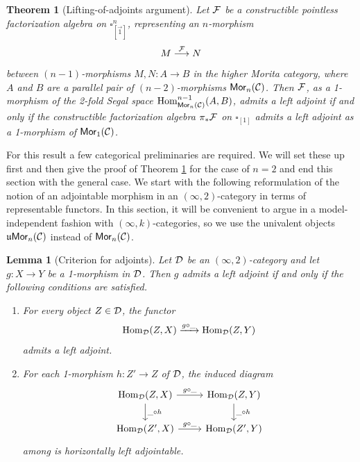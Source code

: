 \documentclass[10pt, reqno, twoside
, final
]{amsart}
\numberwithin{equation}{subsection}%
\theoremstyle{definition}
\theoremstyle{definition}
\theoremstyle{definition}
\theoremstyle{definition}
\theoremstyle{definition}
\theoremstyle{definition}
\theoremstyle{definition}
\theoremstyle{definition}
\theoremstyle{definition}
\theoremstyle{plain}
\newtheorem{thm}[defn]{Theorem}
\theoremstyle{definition}
\theoremstyle{plain}
\theoremstyle{definition}
\theoremstyle{plain}
\theoremstyle{definition}
\theoremstyle{definition}
\theoremstyle{plain}
\newtheorem{lem}[defn]{Lemma}
\theoremstyle{plain}
\theoremstyle{definition}
\theoremstyle{plain}
\theoremstyle{plain}
\theoremstyle{plain}
\begin{document}
\begin{thm}[Lifting-of-adjoints argument]\label{thm:main-lifting-lemma}
Let $\mathcal{F}$ be a constructible pointless factorization algebra on $\square^n_{[\vec{1}]}$, representing an $n$-morphism
\[  M\overset{\mathcal{F}}{\longrightarrow}N  \]
between $(n-1)$-morphisms $M,N:A\rightarrow B$ in the higher Morita category, where $A$ and $B$ are a parallel pair of $(n-2)$-morphisms $\mathsf{Mor}_n(\mathcal{C})$. Then $\mathcal{F}$, as a 1-morphism of the 2-fold Segal space $\mathrm{Hom}_{\mathsf{Mor}_n(\mathcal{C})}^{n-1}(A,B)$, admits a left adjoint if and only if the constructible factorization algebra $\pi_{*}\mathcal{F}$ on $\square_{[1]}$ admits a left adjoint as a 1-morphism of $\mathsf{Mor}_1(\mathcal{C})$.
\end{thm}
For this result a few categorical preliminaries are required. We will set these up first and then give the proof of Theorem \ref{thm:main-lifting-lemma} for the case of $n=2$ and end this section with the general case. We start with the following reformulation of the notion of an adjointable morphism in an $(\infty,2)$-category in terms of representable functors. In this section, it will be convenient to argue in a model-independent fashion with $(\infty,k)$-categories, so we use the univalent objects $\mathfrak{u}\mathsf{Mor}_n(\mathcal{C})$ instead of $\mathsf{Mor}_n(\mathcal{C})$.
\begin{lem}[Criterion for adjoints]\label{lem:adjointcriterion}
Let $\mathcal{D}$ be an $(\infty,2)$-category and let $g:X\rightarrow Y$ be a 1-morphism in $\mathcal{D}$. Then $g$ admits a left adjoint if and only if the following conditions are satisfied.
\begin{enumerate}[$(1)$]
    \item For every object $Z\in\mathcal{D}$, the functor 
    \[  \mathrm{Hom}_{\mathcal{D}}(Z,X) \xrightarrow{g\circ\_} \mathrm{Hom}_{\mathcal{D}}(Z,Y)\]
    admits a left adjoint.
    \item For each 1-morphism $h:Z'\rightarrow Z$ of $\mathcal{D}$, the induced diagram 
    \[
    \begin{tikzcd}
    \Hom_{\icatd}(Z,X)  \ar[d,"\_\circ h"] \ar[r,"g\circ\_"] & \Hom_{\icatd}(Z,Y) \ar[d,"\_\circ h"]\\
    \Hom_{\icatd}(Z',X) \ar[r,"g\circ \_"] & \Hom_{\icatd}(Z',Y)
    \end{tikzcd}
    \]
    among \infcats is horizontally left adjointable.
\end{enumerate}
\end{lem}
\end{document}
